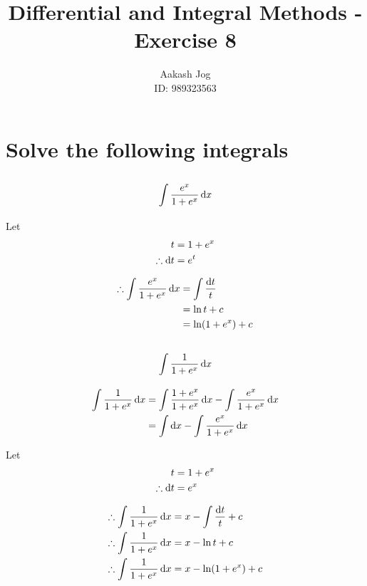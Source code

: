 \documentclass[fleqn, a4paper]{article}
\title{Differential and Integral Methods - Exercise 8}
\author{Aakash Jog\\
	ID: 989323563}
\begin{document}
	
\maketitle
\setlength{\mathindent}{0pt}


\section{Solve the following integrals}

\subsection{\[\int \dfrac{e^x}{1 + e^x} \dif x\]}

Let
\begin{align*}
	t &= 1 + e^x\\
	\therefore \dif t &= e^t	
\end{align*}

\begin{align*}
	\therefore \int \dfrac{e^x}{1 + e^x} \dif x &= \int \dfrac{\dif t}{t}\\
	&= \ln t + c\\
	&= \ln (1 + e^x) + c
\end{align*}

\subsection{\[\int \dfrac{1}{1 + e^x} \dif x\]}

\begin{align*}
	\int \dfrac{1}{1 + e^x} \dif x &= \int \dfrac{1 + e^x}{1 + e^x} \dif x - \int \dfrac{e^x}{1 + e^x} \dif x\\
	&= \int \dif x - \int \dfrac{e^x}{1 + e^x} \dif x
\end{align*}

Let
\begin{align*}
	t &= 1 + e^x\\
	\therefore \dif t &= e^x
\end{align*}

\begin{align*}
	\therefore \int \dfrac{1}{1 + e^x} \dif x &= x - \int \dfrac{\dif t}{t} + c\\
	\therefore \int \dfrac{1}{1 + e^x} \dif x &= x - \ln t + c\\
		\therefore \int \dfrac{1}{1 + e^x} \dif x &= x - \ln (1 + e^x) + c
\end{align*}
\end{document}

